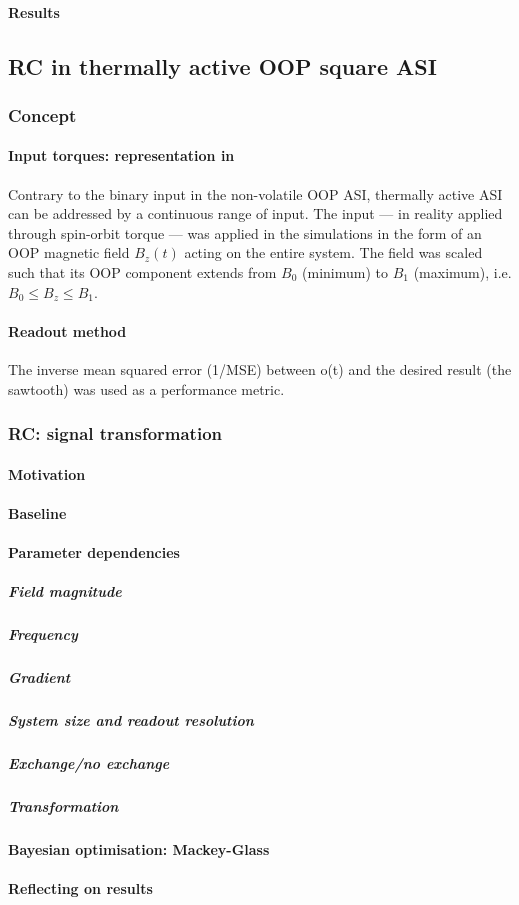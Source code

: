 \paragraph{Results} %

\subsection{RC in thermally active OOP square ASI}
\subsubsection{Concept} %
\paragraph{Input torques: representation in \hotspice}
Contrary to the binary input in the non-volatile OOP ASI, thermally active ASI can be addressed by a continuous range of input.
The input --- in reality applied through spin-orbit torque --- was applied in the simulations in the form of an OOP magnetic field $B_z(t)$ acting on the entire system.
The field was scaled such that its OOP component extends from $B_0$ (minimum) to $B_1$ (maximum), i.e. $B_0 \leq B_z \leq B_1$.

\paragraph{Readout method}
The inverse mean squared error (1/MSE) between o(t) and the desired result (the sawtooth) was used as a performance metric.

\subsubsection{RC: signal transformation}
\paragraph{Motivation} %
\paragraph{Baseline}
\paragraph{Parameter dependencies}
\subparagraph{Field magnitude}
\subparagraph{Frequency}
\subparagraph{Gradient}
\subparagraph{System size and readout resolution}
\subparagraph{Exchange/no exchange}
\subparagraph{Transformation}
\paragraph{Bayesian optimisation: Mackey-Glass}
\paragraph{Reflecting on results} %

